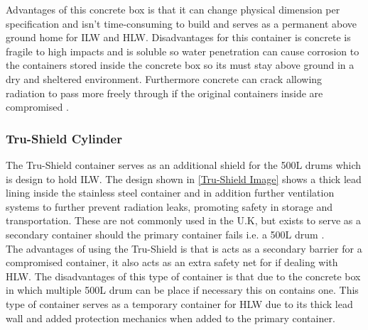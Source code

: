 Advantages of this concrete box is that it can change physical dimension per specification and isn't time-consuming to build and serves as a permanent above ground home for ILW and HLW. Disadvantages for this container is concrete is fragile to high impacts and is soluble so water penetration can cause corrosion to the containers stored inside the concrete box so its must stay above ground in a dry and sheltered environment. Furthermore concrete can crack allowing radiation to pass more freely through if the original containers inside are compromised \cite{ConcreteBoxes}.   

\subsubsection*{Tru-Shield Cylinder}
\label{Tru-Shield Cylinder SubSubSection}

The Tru-Shield container serves as an additional shield for the 500L drums which is design to hold ILW. The design shown in \cref{Tru-Shield Image} shows a thick lead lining inside the stainless steel container and in addition further ventilation systems to further prevent radiation leaks, promoting safety in storage and transportation. These are not commonly used in the U.K, but exists to serve as a secondary container should the primary container fails i.e. a 500L drum \cite{Tru-Shield}.\\

The advantages of using the Tru-Shield is that is acts as a secondary barrier for a compromised container, it also acts as an extra safety net for if dealing with HLW. The disadvantages of this type of container is that due to the concrete box in which multiple 500L drum can be place if necessary this on contains one. This type of container serves as a temporary container for HLW due to its thick lead wall and added protection mechanics when added to the primary container.
